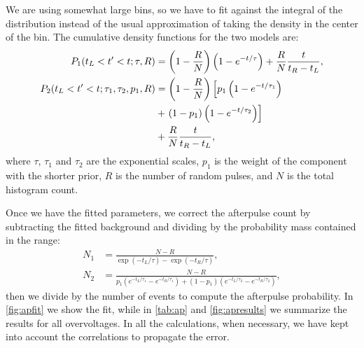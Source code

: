 We are using somewhat large bins, so we have to fit against the integral of the
distribution instead of the usual approximation of taking the density in the
center of the bin. The cumulative density functions for the two models are:
%
\begin{align}
    P_1(t_L < t' < t;\tau,R) &=
    \left(1-\frac RN\right)
    \left(1 - e^{-t/\tau}\right)
    + \frac RN \frac t{t_R-t_L}, \\
    P_2(t_L < t' < t;\tau_1,\tau_2,p_1,R) &=
    \left(1-\frac RN\right)
    \left[p_1 \left(1 - e^{-t/\tau_1}\right)\right. \notag \\
    \phantom x &+ \left.(1 - p_1)
    \left(1 - e^{-t/\tau_2}\right) \right] \notag \\
    \phantom x &+ \frac RN \frac t{t_R-t_L},
\end{align}
%
where $\tau$, $\tau_1$ and $\tau_2$ are the exponential scales, $p_1$ is
the weight of the component with the shorter prior, $R$ is the number of
random pulses, and $N$ is the total histogram count.

Once we have the fitted parameters, we correct the afterpulse count by
subtracting the fitted background and dividing by the probability mass
contained in the range:
%
\begin{align}
    N_1 &= \frac {N-R} {\exp(-t_L/\tau) - \exp(-t_R/\tau)},
    \label{eq:n1} \\
    N_2 &= \frac {N-R} {p_1 (e^{-t_L/\tau_1} - e^{-t_R/\tau_1})
    + (1-p_1) (e^{-t_L/\tau_2} - e^{-t_R/\tau_2})},
    \label{eq:n2}
\end{align}
%
then we divide by the number of events to compute the afterpulse probability.
In \autoref{fig:apfit} we show the fit, while in \autoref{tab:ap} and
\autoref{fig:apresults} we summarize the results for all overvoltages. In all
the calculations, when necessary, we have kept into account the correlations to
propagate the error.


\begin{figure}
    

    
\end{figure}

